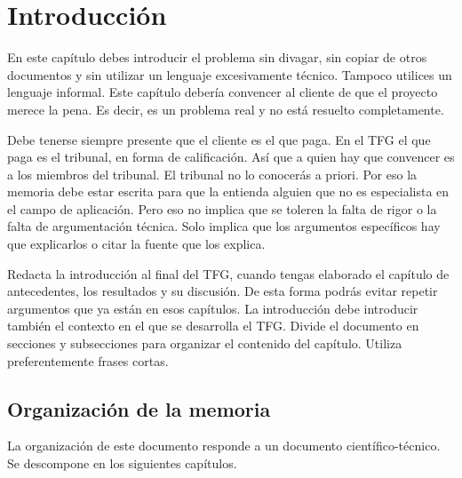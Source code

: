 \chapter{Introducción} 
\label{ch:introduccion}

\avisoLocalizacionArchivo 

En este capítulo debes introducir el problema sin divagar, sin copiar de otros documentos y sin utilizar un lenguaje excesivamente técnico.  Tampoco utilices un lenguaje informal.  Este capítulo debería convencer al cliente de que el proyecto merece la pena.  Es decir, es un problema real y no está resuelto completamente.

Debe tenerse siempre presente que el cliente es el que paga.  En el TFG el que paga es el tribunal, en forma de calificación.  Así que a quien hay que convencer es a los miembros del tribunal.  El tribunal no lo conocerás a priori.  Por eso la memoria debe estar escrita para que la entienda alguien que no es especialista en el campo de aplicación.  Pero eso no implica que se toleren la falta de rigor o la falta de argumentación técnica.  Solo implica que los argumentos específicos hay que explicarlos o citar la fuente que los explica.

Redacta la introducción al final del TFG, cuando tengas elaborado el capítulo de antecedentes, los resultados y su discusión.  De esta forma podrás evitar repetir argumentos que ya están en esos capítulos.  La introducción debe introducir también el contexto en el que se desarrolla el TFG.  Divide el documento en secciones y subsecciones para organizar el contenido del capítulo.  Utiliza preferentemente frases cortas.


\section{Organización de la memoria} 
\label{sec:organizacion-memoria}

La organización de este documento responde a un documento científico-técnico. Se descompone en los siguientes capítulos.

